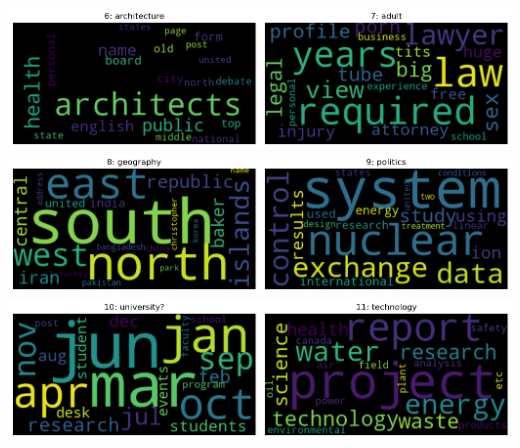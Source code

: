 \includegraphics[width=0.5\textwidth]{images/cc6.png}\includegraphics[width=0.5\textwidth]{images/cc7.png} \\
\includegraphics[width=0.5\textwidth]{images/cc8.png}\includegraphics[width=0.5\textwidth]{images/cc9.png} \\
\includegraphics[width=0.5\textwidth]{images/cc10.png}\includegraphics[width=0.5\textwidth]{images/cc11.png} \\

